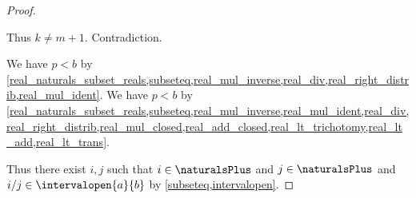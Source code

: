 \begin{proof}
\begin{subproof}
\begin{byCase}
\begin{subproof}
                Thus $k \neq m + 1$.
                Contradiction.
            \end{subproof}
            \begin{byCase}
                We have $p < b$ by \cref{real_naturals_subset_reals,subseteq,real_mul_inverse,real_div,real_right_distrib,real_mul_ident}.
                We have $p < b$ by \cref{real_naturals_subset_reals,subseteq,real_mul_inverse,real_mul_ident,real_div,real_right_distrib,real_mul_closed,real_add_closed,real_lt_trichotomy,real_lt_add,real_lt_trans}.
            \end{byCase}
        \end{byCase}
    \end{subproof}
    Thus there exist $i, j$ such that $i\in\naturalsPlus$ and $j\in\naturalsPlus$ and $i / j\in\intervalopen{a}{b}$ by \cref{subseteq,intervalopen}.
\end{proof}

